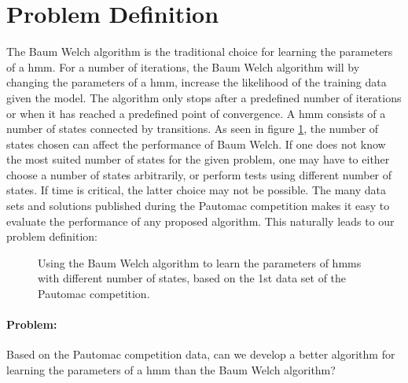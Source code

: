 \section{Problem Definition}

The Baum Welch algorithm is the traditional choice for learning the parameters of a \gls{hmm}\cite{pautomacTR}. 
For a number of iterations, the Baum Welch algorithm will by changing the parameters of a \gls{hmm}, increase the likelihood of the training data given the model. The algorithm only stops after a predefined number of iterations or when it has reached a predefined point of convergence.
A \gls{hmm} consists of a number of states connected by transitions. As seen in figure \ref{fig:bw-states-are-important}, the number of states chosen can affect the performance of Baum Welch. If one does not know the most suited number of states for the given problem, one may have to either choose a number of states arbitrarily, or perform tests using different number of states. If time is critical, the latter choice may not be possible.
The many data sets and solutions published during the Pautomac competition makes it easy to evaluate the performance of any proposed algorithm.
This naturally leads to our problem definition:

\begin{figure}
\begin{centering}
\caption{Using the Baum Welch algorithm to learn the parameters of \gls{hmm}s with different number of states, based on the 1st data set of the Pautomac competition.}
\label{fig:bw-states-are-important} 
\end{centering}
\end{figure}


\paragraph{Problem:}

Based on the Pautomac competition data, can we develop a better algorithm for learning the parameters of a \gls{hmm} than the Baum Welch algorithm?
